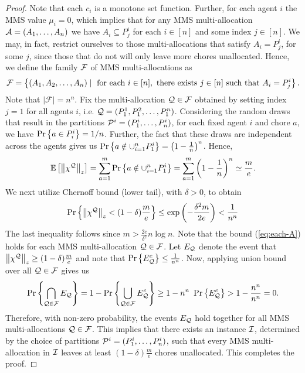 \begin{proof}
    
     Note that each $c_i$ is a monotone set function. Further, for each agent $i$ the MMS value $\mu_i=0$, which implies that for any MMS multi-allocation $\mathcal{A}=(A_1,\ldots,A_n)$ we have  $A_i\subseteq P^i_j$ for each $i\in [n]$ and some index $j\in[n]$. We may, in fact, restrict ourselves to those multi-allocations that satisfy $A_i=P^i_j$, for some $j$, since those that do not will only leave more chores unallocated. Hence, we define the family $\mathcal{F}$ of MMS multi-allocations as 
     \begin{align*}
         \mathcal{F}=\left\{ (A_1,A_2,\dots,A_n) \mid \text{ for each } i\in[n], \text{ there exists }j\in[n]\text{ such that } A_i=P^i_j\right\}.
     \end{align*} 
     Note that $|\mathcal{F}|=n^n$. Fix the multi-allocation $\mathcal{Q}\in\mathcal{F}$ obtained by setting index $j=1$ for all agents $i$, i.e. $\mathcal{Q}=(P^1_1,P^2_1,\dots,P^n_1)$. Considering the random draws that result in the partitions $\mathcal{P}^i= (P^i_1,\dots,P^i_n)$, for each fixed agent $i$ and chore $a$, we have $\Pr \left\{a\in P^i_i\right\}=1/n$. Further, the fact that these draws are independent across the agents gives us $\Pr \left\{a\notin\cup_{i=1}^n P^i_1\right\} = \left(1-\frac{1}{n}\right)^n$. Hence, 
     \begin{align*}
     \mathbb{E}\left[\left\|\chi^{\mathcal{Q}}\right\|_z\right] =\sum_{a=1}^m \Pr \left\{a\notin\cup_{i=1}^n P^i_1\right\} = \sum_{a=1}^m \left(1-\frac{1}{n}\right)^n \simeq\frac{m}{e}.
     \end{align*} 
     We next utilize Chernoff bound (lower tail), with $\delta>0$, to obtain 
     \begin{align}
     \Pr \left\{\left\|\chi^{\mathcal{Q}}\right\|_z < (1-\delta)\frac{m}{e}\right\} \leq \exp\left(-\frac{\delta^2m}{2e}\right)< \frac{1}{n^n} \label{eq:each-A}
     \end{align} 
     The last inequality follows since $m> \frac{2e}{\delta^2}n\log n$. Note that the bound (\ref{eq:each-A}) holds for each MMS multi-allocation $\mathcal{Q} \in \mathcal{F}$. Let $E_{\mathcal{Q}}$ denote the event that $\left\|\chi^{\mathcal{Q}}\right\|_z\geq (1-\delta)\frac{m}{e}$ and note that $\Pr \left\{E^c_{\mathcal{Q}}\right\} \leq \frac{1}{n^n}$. Now, applying union bound over all $\mathcal{Q} \in \mathcal{F}$ gives us  
     \begin{align*}
         \Pr \left\{\bigcap_{\mathcal{Q} \in \mathcal{F}} E_{\mathcal{Q}}\right\} = 1-\Pr \left\{\bigcup_{\mathcal{Q}\in\mathcal{F}} E_{\mathcal{Q}}^c\right\}\geq 1-n^n\  \Pr \left\{E_{\mathcal{Q}}^c\right\}>1-\frac{n^n}{n^n}=0.
     \end{align*}
     Therefore, with non-zero probability, the events $E_{\mathcal{Q}}$ hold together for all MMS multi-allocations $\mathcal{Q}\in \mathcal{F}$. This implies that there exists an instance $\mathcal{I}$, determined by the choice of partitions $\mathcal{P}^i=(P^i_1,\dots,P^i_n)$, such that every MMS multi-allocation in $\mathcal{I}$ leaves at least $(1-\delta)\frac{m}{e}$ chores unallocated. This completes the proof.

    
\end{proof}




